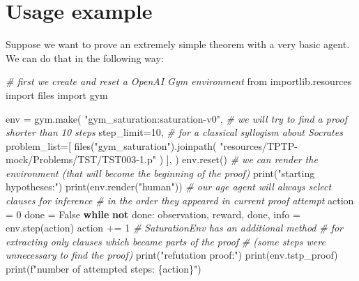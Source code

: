 \documentclass[10pt,a4paper,onecolumn]{article}
\newenvironment{Shaded}{}{}
\newcommand{\BuiltInTok}[1]{#1}
\newcommand{\CommentTok}[1]{\textcolor[rgb]{0.38,0.63,0.69}{\textit{#1}}}
\newcommand{\ControlFlowTok}[1]{\textcolor[rgb]{0.00,0.44,0.13}{\textbf{#1}}}
\newcommand{\DecValTok}[1]{\textcolor[rgb]{0.25,0.63,0.44}{#1}}
\newcommand{\ImportTok}[1]{#1}
\newcommand{\KeywordTok}[1]{\textcolor[rgb]{0.00,0.44,0.13}{\textbf{#1}}}
\newcommand{\NormalTok}[1]{#1}
\newcommand{\OperatorTok}[1]{\textcolor[rgb]{0.40,0.40,0.40}{#1}}
\newcommand{\SpecialCharTok}[1]{\textcolor[rgb]{0.25,0.44,0.63}{#1}}
\newcommand{\SpecialStringTok}[1]{\textcolor[rgb]{0.73,0.40,0.53}{#1}}
\newcommand{\StringTok}[1]{\textcolor[rgb]{0.25,0.44,0.63}{#1}}
\newcommand{\VariableTok}[1]{\textcolor[rgb]{0.10,0.09,0.49}{#1}}
\begin{document}
\hypertarget{usage-example}{%
\section{Usage example}\label{usage-example}}

Suppose we want to prove an extremely simple theorem with a very basic
agent. We can do that in the following way:

\begin{Shaded}
\begin{Highlighting}[]
\CommentTok{\# first we create and reset a OpenAI Gym environment}
\ImportTok{from}\NormalTok{ importlib.resources }\ImportTok{import}\NormalTok{ files}
\ImportTok{import}\NormalTok{ gym}

\NormalTok{env }\OperatorTok{=}\NormalTok{ gym.make(}
    \StringTok{"gym\_saturation:saturation{-}v0"}\NormalTok{,}
    \CommentTok{\# we will try to find a proof shorter than 10 steps}
\NormalTok{    step\_limit}\OperatorTok{=}\DecValTok{10}\NormalTok{,}
    \CommentTok{\# for a classical syllogism about Socrates}
\NormalTok{    problem\_list}\OperatorTok{=}\NormalTok{[}
\NormalTok{        files(}\StringTok{"gym\_saturation"}\NormalTok{).joinpath(}
            \StringTok{"resources/TPTP{-}mock/Problems/TST/TST003{-}1.p"}
\NormalTok{        )}
\NormalTok{    ],}
\NormalTok{)}
\NormalTok{env.reset()}
\CommentTok{\# we can render the environment (that will become the beginning of the proof)}
\BuiltInTok{print}\NormalTok{(}\StringTok{"starting hypotheses:"}\NormalTok{)}
\BuiltInTok{print}\NormalTok{(env.render(}\StringTok{"human"}\NormalTok{))}
\CommentTok{\# our \textquotesingle{}age\textquotesingle{} agent will always select clauses for inference}
\CommentTok{\# in the order they appeared in current proof attempt}
\NormalTok{action }\OperatorTok{=} \DecValTok{0}
\NormalTok{done }\OperatorTok{=} \VariableTok{False}
\ControlFlowTok{while} \KeywordTok{not}\NormalTok{ done:}
\NormalTok{    observation, reward, done, info }\OperatorTok{=}\NormalTok{ env.step(action)}
\NormalTok{    action }\OperatorTok{+=} \DecValTok{1}
\CommentTok{\# SaturationEnv has an additional method}
\CommentTok{\# for extracting only clauses which became parts of the proof}
\CommentTok{\# (some steps were unnecessary to find the proof)}
\BuiltInTok{print}\NormalTok{(}\StringTok{"refutation proof:"}\NormalTok{)}
\BuiltInTok{print}\NormalTok{(env.tstp\_proof)}
\BuiltInTok{print}\NormalTok{(}\SpecialStringTok{f"number of attempted steps: }\SpecialCharTok{\{}\NormalTok{action}\SpecialCharTok{\}}\SpecialStringTok{"}\NormalTok{)}
\end{Highlighting}
\end{Shaded}
\end{document}
